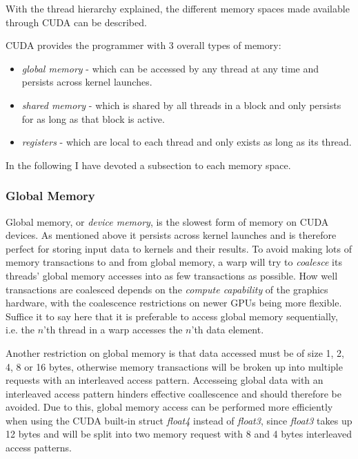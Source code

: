 With the thread hierarchy explained, the different memory spaces made available
through CUDA can be described.

CUDA provides the programmer with 3 overall types of memory:

\begin{itemize}
\item \textit{global memory} - which can be accessed by any thread at any time
  and persists across kernel launches.
\item \textit{shared memory} - which is shared by all threads in a block and
  only persists for as long as that block is active.
\item \textit{registers} - which are local to each thread and only exists as
  long as its thread.
\end{itemize}

In the following I have devoted a subsection to each memory space.

\subsubsection{Global Memory}


Global memory, or \textit{device memory}, is the slowest form of memory on CUDA
devices. As mentioned above it persists across kernel launches and is therefore
perfect for storing input data to kernels and their results. To avoid making
lots of memory transactions to and from global memory, a warp will try to
\textit{coalesce} its threads' global memory accesses into as few transactions
as possible. How well transactions are coalesced depends on the \textit{compute
  capability} of the graphics hardware, with the coalescence restrictions on
newer GPUs being more flexible. Suffice it to say here that it is preferable to
access global memory sequentially, i.e. the $n$'th thread in a warp accesses the
$n$'th data element.


Another restriction on global memory is that data accessed must be of size 1, 2,
4, 8 or 16 bytes, otherwise memory transactions will be broken up into multiple
requests with an interleaved access pattern. Accesseing global data with an
interleaved access pattern hinders effective coallescence and should therefore
be avoided. Due to this, global memory access can be performed more efficiently
when using the CUDA built-in struct \textit{float4} instead of \textit{float3},
since \textit{float3} takes up 12 bytes and will be split into two memory
request with 8 and 4 bytes interleaved access patterns.

